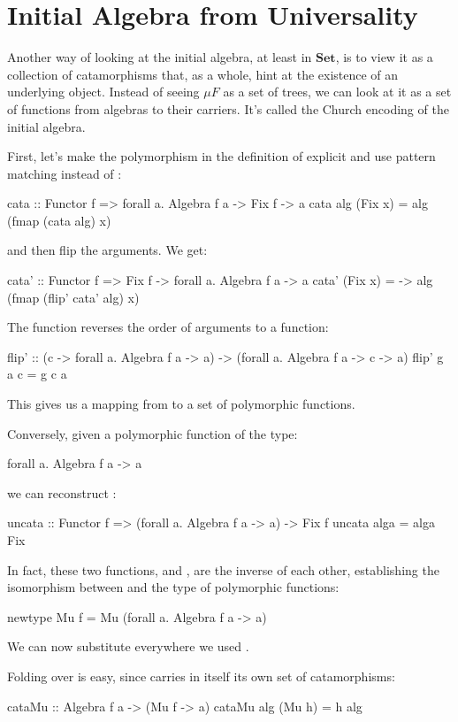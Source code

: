 \documentclass[DaoFP]{subfiles}
\begin{document}
\section{Initial Algebra from Universality}

Another way of looking at the initial algebra, at least in $\mathbf{Set}$, is to view it as a collection of catamorphisms that, as a whole, hint at the existence of an underlying object. Instead of seeing $\mu F$ as a set of trees, we can look at it as a set of functions from algebras to their carriers. It's called the Church encoding of the initial algebra.


First, let's make the polymorphism in the definition of  explicit and use pattern matching instead of :
\begin{haskell}
cata :: Functor f => forall a. Algebra f a -> Fix f -> a
cata alg (Fix x) = alg (fmap (cata alg) x)
\end{haskell}
and then flip the arguments. We get:
\begin{haskell}
cata' :: Functor f => Fix f -> forall a. Algebra f a -> a
cata' (Fix x) = \alg -> alg (fmap (flip' cata' alg) x)
\end{haskell}
The function  reverses the order of arguments to a function:
\begin{haskell}
    flip' :: (c -> forall a. Algebra f a -> a) -> 
             (forall a. Algebra f a -> c -> a)
    flip' g a c = g c a
\end{haskell}
This gives us a mapping from  to a set of polymorphic functions.

Conversely, given a polymorphic function of the type:
\begin{haskell}
forall a. Algebra f a -> a
\end{haskell}
we can reconstruct :
\begin{haskell}
uncata :: Functor f => (forall a. Algebra f a -> a) -> Fix f
uncata alga = alga Fix
\end{haskell}
In fact, these two functions,  and , are the inverse of each other, establishing the isomorphism between  and the type of polymorphic functions:
\begin{haskell}
newtype Mu f = Mu (forall a. Algebra f a -> a)
\end{haskell}
We can now substitute  everywhere we used  .

Folding over  is easy, since  carries in itself its own set of catamorphisms:
\begin{haskell}
cataMu :: Algebra f a -> (Mu f -> a)
cataMu alg (Mu h) = h alg
\end{haskell}
\end{document}

